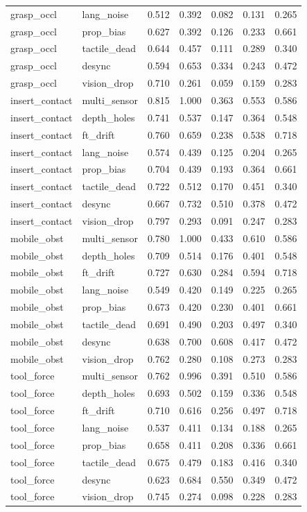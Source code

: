 \documentclass{article}
\begin{document}
\begin{longtable}{@{}llrrrrr@{}}
grasp\_occl & lang\_noise & 0.512 & 0.392 & 0.082 & 0.131 & 0.265 \\
grasp\_occl & prop\_bias & 0.627 & 0.392 & 0.126 & 0.233 & 0.661 \\
grasp\_occl & tactile\_dead & 0.644 & 0.457 & 0.111 & 0.289 & 0.340 \\
grasp\_occl & desync & 0.594 & 0.653 & 0.334 & 0.243 & 0.472 \\
grasp\_occl & vision\_drop & 0.710 & 0.261 & 0.059 & 0.159 & 0.283 \\
insert\_contact & multi\_sensor & 0.815 & 1.000 & 0.363 & 0.553 & 0.586 \\
insert\_contact & depth\_holes & 0.741 & 0.537 & 0.147 & 0.364 & 0.548 \\
insert\_contact & ft\_drift & 0.760 & 0.659 & 0.238 & 0.538 & 0.718 \\
insert\_contact & lang\_noise & 0.574 & 0.439 & 0.125 & 0.204 & 0.265 \\
insert\_contact & prop\_bias & 0.704 & 0.439 & 0.193 & 0.364 & 0.661 \\
insert\_contact & tactile\_dead & 0.722 & 0.512 & 0.170 & 0.451 & 0.340 \\
insert\_contact & desync & 0.667 & 0.732 & 0.510 & 0.378 & 0.472 \\
insert\_contact & vision\_drop & 0.797 & 0.293 & 0.091 & 0.247 & 0.283 \\
mobile\_obst & multi\_sensor & 0.780 & 1.000 & 0.433 & 0.610 & 0.586 \\
mobile\_obst & depth\_holes & 0.709 & 0.514 & 0.176 & 0.401 & 0.548 \\
mobile\_obst & ft\_drift & 0.727 & 0.630 & 0.284 & 0.594 & 0.718 \\
mobile\_obst & lang\_noise & 0.549 & 0.420 & 0.149 & 0.225 & 0.265 \\
mobile\_obst & prop\_bias & 0.673 & 0.420 & 0.230 & 0.401 & 0.661 \\
mobile\_obst & tactile\_dead & 0.691 & 0.490 & 0.203 & 0.497 & 0.340 \\
mobile\_obst & desync & 0.638 & 0.700 & 0.608 & 0.417 & 0.472 \\
mobile\_obst & vision\_drop & 0.762 & 0.280 & 0.108 & 0.273 & 0.283 \\
tool\_force & multi\_sensor & 0.762 & 0.996 & 0.391 & 0.510 & 0.586 \\
tool\_force & depth\_holes & 0.693 & 0.502 & 0.159 & 0.336 & 0.548 \\
tool\_force & ft\_drift & 0.710 & 0.616 & 0.256 & 0.497 & 0.718 \\
tool\_force & lang\_noise & 0.537 & 0.411 & 0.134 & 0.188 & 0.265 \\
tool\_force & prop\_bias & 0.658 & 0.411 & 0.208 & 0.336 & 0.661 \\
tool\_force & tactile\_dead & 0.675 & 0.479 & 0.183 & 0.416 & 0.340 \\
tool\_force & desync & 0.623 & 0.684 & 0.550 & 0.349 & 0.472 \\
tool\_force & vision\_drop & 0.745 & 0.274 & 0.098 & 0.228 & 0.283 \\
\bottomrule
\end{longtable}
\end{document}
